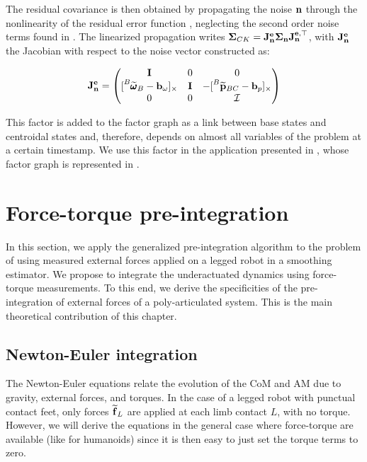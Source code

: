 The residual covariance is then obtained by propagating the noise ${\bf n}$ through the nonlinearity of the residual error function , 
neglecting the second order noise terms found in . The linearized propagation writes
${\bm \Sigma}_{CK} = {\bf J}^{{\bf e}}_{{\bf n}} {\bm \Sigma}_{{\bf n}} {\bf J}^{{\bf e},\top}_{{\bf n}}$, with ${\bf J}^{{\bf e}}_{{\bf n}}$ the Jacobian with respect to the noise vector constructed as:

\begin{equation}
    \bfJ^{\bfe}_{\noise} = 
    \begin{pmatrix}
    \Ident & 0 & 0 
    \\
    [\angvelm{B}{B} - \bias_{\omega}]_{\times} & \Ident & -[\posim{B}{BC} -  \bias_{p}]_{\times}
    \\
    0 & 0 & \Inertia
    \end{pmatrix}
\end{equation}



This factor is added to the factor graph as a link between base states and centroidal states and, therefore, depends on almost all variables of the problem
at a certain timestamp. We use this factor in the application presented in , whose factor graph is represented in 
.



\section{Force-torque pre-integration}
\label{sec:force_torque_preint}
In this section, we apply the generalized pre-integration algorithm to the problem of using measured external
forces applied on a legged robot in a smoothing estimator. We propose to integrate the underactuated dynamics  using force-torque measurements.
To this end, we derive the specificities of the pre-integration of external forces of a poly-articulated system. This is the main theoretical contribution
of this chapter.

\subsection{Newton-Euler integration}
The Newton-Euler equations  relate the evolution of the CoM and AM due to gravity, external forces, and torques. 
In the case of a legged robot with punctual contact feet, only forces $\prescript{}{}{\widetilde{{\bf f}}}_{L}$ are applied at each limb contact $L$, with no torque. 
However, we will derive the equations in the general case where force-torque are available (like for humanoids) since it is then easy to just set the 
torque terms to zero.


